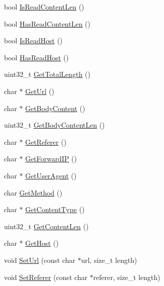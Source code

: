 \begin{DoxyCompactItemize}
\item 
bool \hyperlink{class_c_http_parser_wrapper_aab3cf06aab056c83eb6bcc1122fbdc56}{Is\+Read\+Content\+Len} ()
\item 
bool \hyperlink{class_c_http_parser_wrapper_a5297f1f0be59709d7d3f178b2679d12d}{Has\+Read\+Content\+Len} ()
\item 
bool \hyperlink{class_c_http_parser_wrapper_ab5917110e0ecbf3365d23d1d6e17ab9c}{Is\+Read\+Host} ()
\item 
bool \hyperlink{class_c_http_parser_wrapper_a9f192162a7d6a20bd460a42dce3522a8}{Has\+Read\+Host} ()
\item 
uint32\+\_\+t \hyperlink{class_c_http_parser_wrapper_a557d7299aef783b0db0ebff11bf7f88c}{Get\+Total\+Length} ()
\item 
char $\ast$ \hyperlink{class_c_http_parser_wrapper_aafccf315c7b4f4c75cef0b98a8b56858}{Get\+Url} ()
\item 
char $\ast$ \hyperlink{class_c_http_parser_wrapper_a3b0c8298e7567cf1a092c429609c8494}{Get\+Body\+Content} ()
\item 
uint32\+\_\+t \hyperlink{class_c_http_parser_wrapper_a8f997f682aa253bf9b635106be15d1e9}{Get\+Body\+Content\+Len} ()
\item 
char $\ast$ \hyperlink{class_c_http_parser_wrapper_a52643fdaaf0b99f9fae390e9dfe6ac4f}{Get\+Referer} ()
\item 
char $\ast$ \hyperlink{class_c_http_parser_wrapper_ac2bad07ac2d2831bdc3131defd5e6ef6}{Get\+Forward\+I\+P} ()
\item 
char $\ast$ \hyperlink{class_c_http_parser_wrapper_aa4aa608f73388c2c0d9c0ef4518ec7b0}{Get\+User\+Agent} ()
\item 
char \hyperlink{class_c_http_parser_wrapper_af149784a7127b0da55b6453367d5bd2d}{Get\+Method} ()
\item 
char $\ast$ \hyperlink{class_c_http_parser_wrapper_a944e144e999b4622c5b29f412a8ec1fd}{Get\+Content\+Type} ()
\item 
uint32\+\_\+t \hyperlink{class_c_http_parser_wrapper_a58728121d12bf8411969cf7c4ac57610}{Get\+Content\+Len} ()
\item 
char $\ast$ \hyperlink{class_c_http_parser_wrapper_a2610085f6a364470e55ab74587af6531}{Get\+Host} ()
\item 
void \hyperlink{class_c_http_parser_wrapper_a2601a18c62f8f7dfbc88a555f625d765}{Set\+Url} (const char $\ast$url, size\+\_\+t length)
\item 
void \hyperlink{class_c_http_parser_wrapper_a0a5171972f6a85fde1d601e74e7c8dd0}{Set\+Referer} (const char $\ast$referer, size\+\_\+t length)

\end{DoxyCompactItemize}
